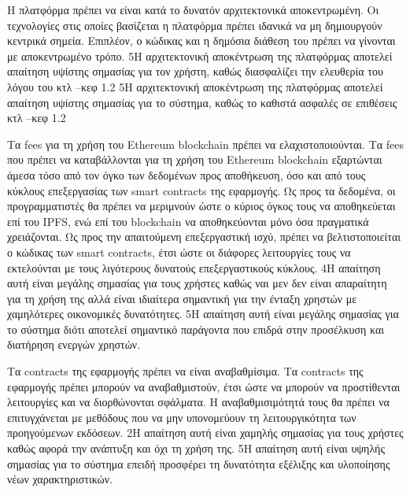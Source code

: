 \begin{enumerate}[label=\textbf{<ΜΛΑ-\arabic*>}, leftmargin=\parindent, align=left, labelwidth=\parindent, labelsep=0pt]
	\sysReqItem
		{\label{srs:non-functional-srs-maximum-decentraliztion}}
		{Η πλατφόρμα πρέπει να είναι κατά το δυνατόν αρχιτεκτονικά αποκεντρωμένη.}
		{Οι τεχνολογίες στις οποίες βασίζεται η πλατφόρμα πρέπει ιδανικά να μη δημιουργούν κεντρικά σημεία. Επιπλέον, ο κώδικας και η δημόσια διάθεση του πρέπει να γίνονται με αποκεντρωμένο τρόπο.}
		{5}{Η αρχιτεκτονική αποκέντρωση της πλατφόρμας αποτελεί απαίτηση υψίστης σημασίας για τον χρήστη, καθώς διασφαλίζει την ελευθερία του λόγου του κτλ --κεφ 1.2}
		{5}{Η αρχιτεκτονική αποκέντρωση της πλατφόρμας αποτελεί απαίτηση υψίστης σημασίας για το σύστημα, καθώς το καθιστά ασφαλές σε επιθέσεις κτλ --κεφ 1.2}

	\sysReqItem
		{\label{srs:non-functional-srs-minimize-fees}}
		{Τα fees για τη χρήση του Ethereum blockchain πρέπει να ελαχιστοποιούνται.}
		{Τα fees που πρέπει να καταβάλλονται για τη χρήση του Ethereum blockchain εξαρτώνται άμεσα τόσο από τον όγκο των δεδομένων προς αποθήκευση, όσο και από τους κύκλους επεξεργασίας των smart contracts της εφαρμογής. Ως προς τα δεδομένα, οι προγραμματιστές θα πρέπει να μεριμνούν ώστε ο κύριος όγκος τους να αποθηκεύεται επί του IPFS, ενώ επί του blockchain να αποθηκεύονται μόνο όσα πραγματικά χρειάζονται. Ως προς την απαιτούμενη επεξεργαστική ισχύ, πρέπει να βελτιστοποιείται ο κώδικας των smart contracts, έτσι ώστε οι διάφορες λειτουργίες τους να εκτελούνται με τους λιγότερους δυνατούς επεξεργαστικούς κύκλους.}
		{4}{Η απαίτηση αυτή είναι μεγάλης σημασίας για τους χρήστες καθώς ναι μεν δεν είναι απαραίτητη για τη χρήση της αλλά είναι ιδιαίτερα σημαντική για την ένταξη χρηστών με χαμηλότερες οικονομικές δυνατότητες.}
		{5}{Η απαίτηση αυτή είναι μεγάλης σημασίας για το σύστημα διότι αποτελεί σημαντικό παράγοντα που επιδρά στην προσέλκυση και διατήρηση ενεργών χρηστών.}

	\sysReqItem
		{\label{srs:non-functional-srs-upgrade-contracts}}
		{Τα contracts της εφαρμογής πρέπει να είναι αναβαθμίσιμα.}
		{Τα contracts της εφαρμογής πρέπει μπορούν να αναβαθμιστούν, έτσι ώστε να μπορούν να προστίθενται λειτουργίες και να διορθώνονται σφάλματα. Η αναβαθμισιμότητά τους θα πρέπει να επιτυγχάνεται με μεθόδους που να μην υπονομεύουν τη λειτουργικότητα των  προηγούμενων εκδόσεων.}
		{2}{Η απαίτηση αυτή είναι χαμηλής σημασίας για τους χρήστες καθώς αφορά την ανάπτυξη και όχι τη χρήση της.}
		{5}{Η απαίτηση αυτή είναι υψηλής σημασίας για το σύστημα επειδή προσφέρει τη δυνατότητα εξέλιξης και υλοποίησης νέων χαρακτηριστικών.}
\end{enumerate}
